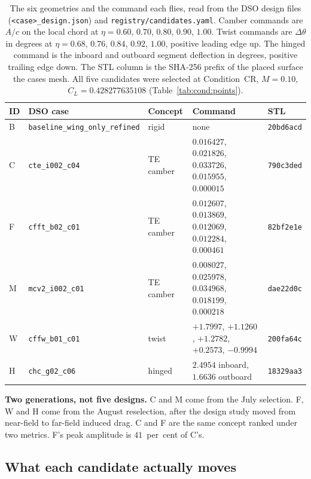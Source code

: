 \begin{table}[htbp]
  \centering
  \scriptsize
  \setlength{\tabcolsep}{4pt}
  \caption{The six geometries and the command each flies, read from the DSO design files
  (\texttt{<case>\_design.json}) and \texttt{registry/candidates.yaml}. Camber commands are $A/c$
  on the local chord at $\eta = 0.60$, $0.70$, $0.80$, $0.90$, $1.00$. Twist commands are
  $\Delta\theta$ in degrees at $\eta = 0.68$, $0.76$, $0.84$, $0.92$, $1.00$, positive leading
  edge up. The hinged command is the inboard and outboard segment deflection in degrees, positive
  trailing edge down. The STL column is the SHA-256 prefix of the placed surface the cases mesh.
  All five candidates were selected at Condition~CR, $M = 0.10$, $C_L = 0.428277635108$
  (Table~\ref{tab:cond:points}).}
  \label{tab:geom:command}
  \begin{tabular}{lllll}
    \toprule
    ID & DSO case & Concept & Command & STL \\
    \midrule
    B & \texttt{baseline\_wing\_only\_refined} & rigid     & none & \texttt{20bd6acd} \\
    C & \texttt{cte\_i002\_c04}  & TE camber & $0.016427$, $0.021826$, $0.033726$, $0.015955$, $0.000015$ & \texttt{790c3ded} \\
    F & \texttt{cfft\_b02\_c01}  & TE camber & $0.012607$, $0.013869$, $0.012069$, $0.012284$, $0.000461$ & \texttt{82bf2e1e} \\
    M & \texttt{mcv2\_i002\_c01} & TE camber & $0.008027$, $0.025978$, $0.034968$, $0.018199$, $0.000218$ & \texttt{dae22d0c} \\
    W & \texttt{cffw\_b01\_c01}  & twist     & $+1.7997$, $+1.1260$, $+1.2782$, $+0.2573$, $-0.9994$ & \texttt{200fa64c} \\
    H & \texttt{chc\_g02\_c06}   & hinged    & $2.4954$ inboard, $1.6636$ outboard & \texttt{18329aa3} \\
    \bottomrule
  \end{tabular}
\end{table}

\textbf{Two generations, not five designs.} C and M come from the July selection. F, W and H come
from the August reselection, after the design study moved from near-field to far-field induced
drag. C and F are the same concept ranked under two metrics. F's peak amplitude is $41$~per~cent
of C's.

\subsection{What each candidate actually moves}
\label{sec:geom:delta}

